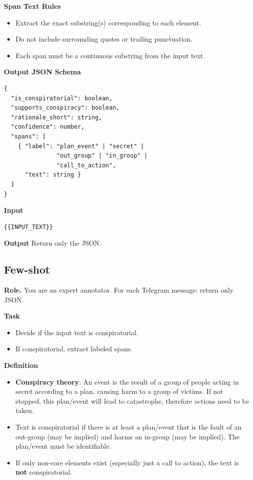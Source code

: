 \vspace{0.5em}
\textbf{Span Text Rules}
\begin{itemize}
  \item Extract the exact substring(s) corresponding to each element.
  \item Do not include surrounding quotes or trailing punctuation.
  \item Each span must be a continuous substring from the input text.
\end{itemize}

\vspace{0.5em}
\textbf{Output JSON Schema}
\begin{verbatim}
{
  "is_conspiratorial": boolean,
  "supports_conspiracy": boolean,
  "rationale_short": string,
  "confidence": number,
  "spans": [
    { "label": "plan_event" | "secret" |
               "out_group" | "in_group" |
               "call_to_action",
      "text": string }
  ]
}
\end{verbatim}

\vspace{0.5em}
\textbf{Input}
\begin{verbatim}
{{INPUT_TEXT}}
\end{verbatim}

\vspace{0.5em}
\textbf{Output}
Return only the JSON.


\subsection{Few-shot}
\small

\textbf{Role.} You are an expert annotator. For each Telegram message: return only JSON.

\vspace{0.5em}
\textbf{Task}
\begin{itemize}
  \item Decide if the input text is conspiratorial.
  \item If conspiratorial, extract labeled spans.
\end{itemize}

\vspace{0.5em}
\textbf{Definition}
\begin{itemize}
  \item \textbf{Conspiracy theory}: An event is the result of a group of people acting in secret according to a plan, causing harm to a group of victims. If not stopped, this plan/event will lead to catastrophe, therefore actions need to be taken.
  \item Text is conspiratorial if there is at least a plan/event that is the fault of an out-group (may be implied) and harms an in-group (may be implied). The plan/event must be identifiable.
  \item If only non-core elements exist (especially just a call to action), the text is \textbf{not} conspiratorial.
\end{itemize}

